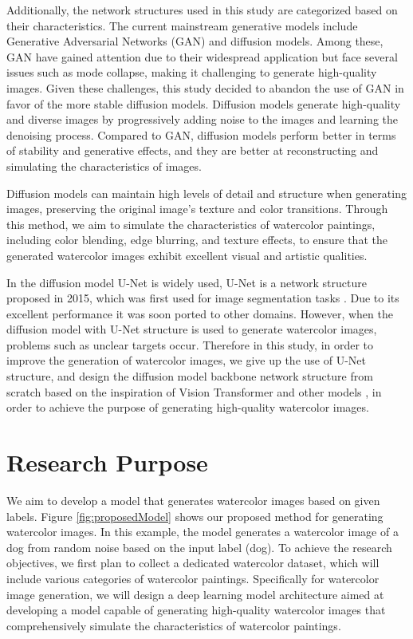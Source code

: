 \documentclass[12pt]{report}
\begin{document}
Additionally, the network structures used in this study are categorized based on their characteristics. The current mainstream generative models include Generative Adversarial Networks (GAN) \cite{goodfellow2020generative} and diffusion models. Among these, GAN have gained attention due to their widespread application but face several issues such as mode collapse, making it challenging to generate high-quality images. Given these challenges, this study decided to abandon the use of GAN in favor of the more stable diffusion models. Diffusion models generate high-quality and diverse images by progressively adding noise to the images and learning the denoising process. Compared to GAN, diffusion models perform better in terms of stability and generative effects, and they are better at reconstructing and simulating the characteristics of images.

Diffusion models can maintain high levels of detail and structure when generating images, preserving the original image's texture and color transitions. Through this method, we aim to simulate the characteristics of watercolor paintings, including color blending, edge blurring, and texture effects, to ensure that the generated watercolor images exhibit excellent visual and artistic qualities.

In the diffusion model U-Net is widely used, U-Net is a network structure proposed in 2015, which was first used for image segmentation tasks \cite{ho2020denoising}\cite{ronneberger2015u}\cite{rombach2022high}. Due to its excellent performance it was soon ported to other domains. However, when the diffusion model with U-Net structure is used to generate watercolor images, problems such as unclear targets occur. Therefore in this study, in order to improve the generation of watercolor images, we give up the use of U-Net structure, and design the diffusion model backbone network structure from scratch based on the inspiration of Vision Transformer and other models \cite{dosovitskiy2020image}, in order to achieve the purpose of generating high-quality watercolor images.

\section{Research Purpose}
We aim to develop a model that generates watercolor images based on given labels. Figure \ref{fig:proposedModel} shows our proposed method for generating watercolor images. In this example, the model generates a watercolor image of a dog from random noise based on the input label (dog). To achieve the research objectives, we first plan to collect a dedicated watercolor dataset, which will include various categories of watercolor paintings. Specifically for watercolor image generation, we will design a deep learning model architecture aimed at developing a model capable of generating high-quality watercolor images that comprehensively simulate the characteristics of watercolor paintings.
\end{document}
